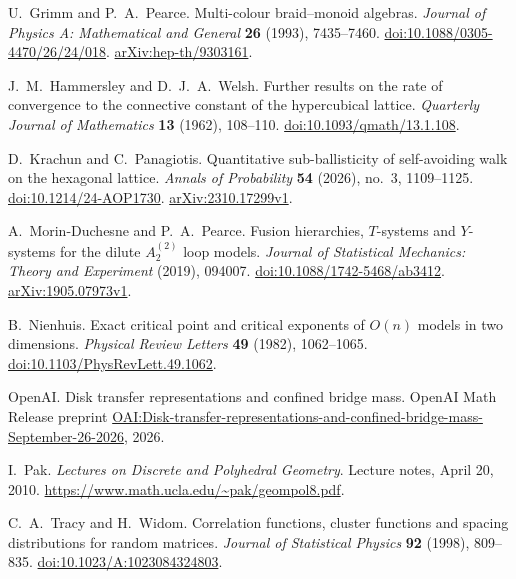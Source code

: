 U.~Grimm and P.~A.~Pearce.
Multi-colour braid--monoid algebras.
\emph{Journal of Physics A: Mathematical and General} \textbf{26} (1993), 7435--7460.
\href{https://doi.org/10.1088/0305-4470/26/24/018}{doi:10.1088/0305-4470/26/24/018}.
\href{https://arxiv.org/abs/hep-th/9303161}{arXiv:hep-th/9303161}.

J.~M.~Hammersley and D.~J.~A.~Welsh.
Further results on the rate of convergence to the connective constant of
the hypercubical lattice.
\emph{Quarterly Journal of Mathematics} \textbf{13} (1962), 108--110.
\href{https://doi.org/10.1093/qmath/13.1.108}{doi:10.1093/qmath/13.1.108}.

D.~Krachun and C.~Panagiotis.
Quantitative sub-ballisticity of self-avoiding walk on the hexagonal lattice.
\emph{Annals of Probability} \textbf{54} (2026), no.~3, 1109--1125.
\href{https://doi.org/10.1214/24-AOP1730}{doi:10.1214/24-AOP1730}.
\href{https://arxiv.org/abs/2310.17299v1}{arXiv:2310.17299v1}.

A.~Morin-Duchesne and P.~A.~Pearce.
Fusion hierarchies, $T$-systems and $Y$-systems for the dilute $A_2^{(2)}$
loop models.
\emph{Journal of Statistical Mechanics: Theory and Experiment} (2019), 094007.
\href{https://doi.org/10.1088/1742-5468/ab3412}{doi:10.1088/1742-5468/ab3412}.
\href{https://arxiv.org/abs/1905.07973v1}{arXiv:1905.07973v1}.

B.~Nienhuis.
Exact critical point and critical exponents of $O(n)$ models in two dimensions.
\emph{Physical Review Letters} \textbf{49} (1982), 1062--1065.
\href{https://doi.org/10.1103/PhysRevLett.49.1062}{doi:10.1103/PhysRevLett.49.1062}.

OpenAI.
Disk transfer representations and confined bridge mass.
OpenAI Math Release preprint
\href{https://github.com/openai/math/blob/main/preprints/Disk-transfer-representations-and-confined-bridge-mass-September-26-2026/main.pdf}{OAI:Disk-transfer-representations-and-confined-bridge-mass-September-26-2026},
2026.

I.~Pak.
\emph{Lectures on Discrete and Polyhedral Geometry}.
Lecture notes, April 20, 2010.
\url{https://www.math.ucla.edu/~pak/geompol8.pdf}.

C.~A.~Tracy and H.~Widom.
Correlation functions, cluster functions and spacing distributions for random matrices.
\emph{Journal of Statistical Physics} \textbf{92} (1998), 809--835.
\href{https://doi.org/10.1023/A:1023084324803}{doi:10.1023/A:1023084324803}.

